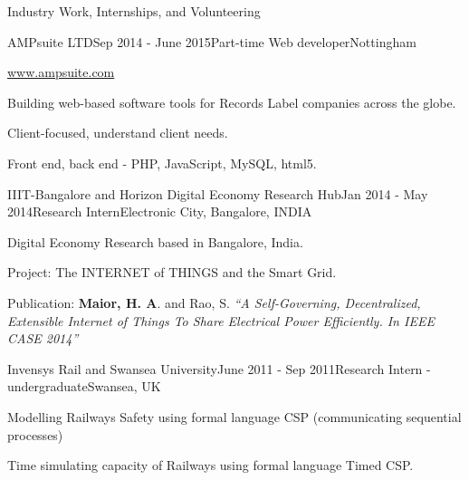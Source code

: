 \documentclass{resume} %
\begin{document}
\begin{rSection}{Industry Work, Internships, and Volunteering}

  \begin{rSubsection}{AMPsuite LTD}{Sep 2014 - June 2015}{Part-time Web developer}{Nottingham}
  		\item \url{www.ampsuite.com}
        \item Building web-based software tools for Records Label companies across the globe.
        \item Client-focused, understand client needs.
        \item Front end, back end - PHP, JavaScript, MySQL, html5.
    \end{rSubsection}

	\begin{rSubsection}{IIIT-Bangalore and Horizon Digital Economy Research Hub}{Jan 2014 - May 2014}{Research Intern}{Electronic City, Bangalore, INDIA}
	\item Digital Economy Research based in Bangalore, India.
	\item Project: The INTERNET of THINGS and the Smart Grid.
	\item Publication: \textbf{Maior, H. A}. and Rao, S.  \emph{``A Self-Governing, Decentralized, Extensible Internet of Things To Share Electrical Power Efficiently. In IEEE CASE 2014''}
\end{rSubsection}
	
\begin{rSubsection}{Invensys Rail and Swansea University}{June 2011 - Sep 2011}{Research Intern - undergraduate}{Swansea, UK}
	\item Modelling Railways Safety using formal language CSP (communicating sequential processes)
	\item Time simulating capacity of Railways using formal language Timed CSP.
\end{rSubsection}

\end{rSection}
\end{document}
